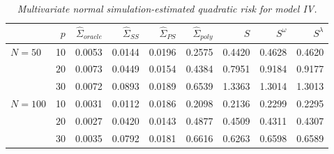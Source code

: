 %

\begin{table}[H]
\centering
\caption{\textit{Multivariate normal simulation-estimated quadratic risk  for model IV.} }
\begin{tabular}{lrrrrrrrr}
  & $p$ &$\hat{\Sigma}_{oracle}$ &$\hat{\Sigma}_{SS}$& $\hat{\Sigma}_{PS}$ & $\hat{\Sigma}_{poly}$ & $S$ &$S^\omega$& $S^\lambda$ \\ 
  \hline
$N = 50$ & 10 &0.0053 & 0.0144 & 0.0196 &  0.2575 & 0.4420 & 0.4628 & 0.4620 \\ 
  & $20$ & 0.0073 & 0.0449 & 0.0154 & 0.4384 & 0.7951 & 0.9184 & 0.9177 \\ 
  & $30$ & 0.0072 & 0.0893 & 0.0189 &  0.6539 & 1.3363 & 1.3014 & 1.3013 \\ 
 $N = 100$ & 10 &0.0031 & 0.0112 & 0.0186 &  0.2098 & 0.2136 & 0.2299 & 0.2295 \\ 
    &    $20$ &  0.0027 & 0.0420 & 0.0143 & 0.4877 & 0.4509 & 0.4311 & 0.4307 \\ 
    &    $30$ &0.0035 & 0.0792 & 0.0181 &  0.6616 & 0.6263 & 0.6598 & 0.6589 \\ 
   \hline
\end{tabular}
\label{table:simulation-1-quad-loss-sigma-4}
\end{table}

